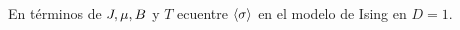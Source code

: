 \begin{ej}
	En términos de $J,\mu,B$ y $T$ ecuentre $\ev{\s }$ en el modelo de Ising en $D=1$.
\end{ej}




































































